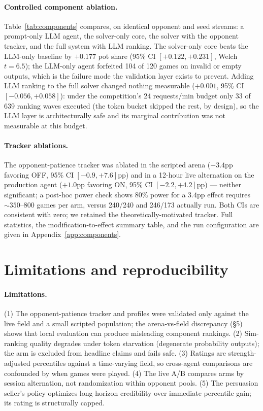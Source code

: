\documentclass{article}
\begin{document}
\paragraph{Controlled component ablation.} Table~\ref{tab:components} compares, on identical opponent and seed streams: a prompt-only LLM agent, the solver-only core, the solver with the opponent tracker, and the full system with LLM ranking. The solver-only core beats the LLM-only baseline by $+0.177$ pot share (95\% CI $[+0.122, +0.231]$, Welch $t=6.5$); the LLM-only agent forfeited 104 of 120 games on invalid or empty outputs, which is the failure mode the validation layer exists to prevent. Adding LLM ranking to the full solver changed nothing measurable ($+0.001$, 95\% CI $[-0.056, +0.058]$): under the competition's 24 requests/min budget only 33 of 639 ranking waves executed (the token bucket skipped the rest, by design), so the LLM layer is architecturally safe and its marginal contribution was not measurable at this budget.

\paragraph{Tracker ablations.} The opponent-patience tracker was ablated in the scripted arena ($-3.4$pp favoring OFF, 95\% CI $[-0.9, +7.6]$pp) and in a 12-hour live alternation on the production agent ($+1.0$pp favoring ON, 95\% CI $[-2.2, +4.2]$pp) --- neither significant; a post-hoc power check shows 80\% power for a $3.4$pp effect requires ${\sim}350$--$800$ games per arm, versus 240/240 and 246/173 actually run. Both CIs are consistent with zero; we retained the theoretically-motivated tracker. Full statistics, the modification-to-effect summary table, and the run configuration are given in Appendix~\ref{app:components}.

\section{Limitations and reproducibility}
\paragraph{Limitations.} (1) The opponent-patience tracker and profiles were validated only against the live field and a small scripted population; the arena-vs-field discrepancy (\S5) shows that local evaluation can produce misleading component rankings. (2) Sim-ranking quality degrades under token starvation (degenerate probability outputs); the arm is excluded from headline claims and fails safe. (3) Ratings are strength-adjusted percentiles against a time-varying field, so cross-agent comparisons are confounded by when games were played. (4) The live A/B compares arms by session alternation, not randomization within opponent pools. (5) The persuasion seller's policy optimizes long-horizon credibility over immediate percentile gain; its rating is structurally capped.
\end{document}

